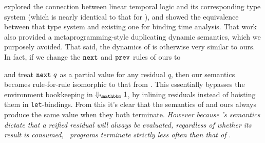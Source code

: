 \cite{davies96} explored the connection between linear temporal logic and its corresponding type system (which is nearly identical to that for \lang), 
and showed the equivalence between that type system and existing one for binding time analysis. 
That work also provided a metaprogramming-style duplicating dynamic semantics, which we purposely avoided.
That said, the dynamics of \cite{davies96} is otherwise very similar to ours.
In fact, if we change the ${\tt next}$ and ${\tt prev}$ rules of ours to 
and treat ${\tt next}~q$ as a partial value for any residual $q$,
then our semantics becomes rule-for-rule isomorphic to that from \cite{davies96}. This essentially bypasses the
environment bookkeeping in $\redonesym$, by inlining residuals instead of
hoisting them in \verb|let|-bindings.
From this it's clear that the semantics of \cite{davies96} and ours always produce the same value when they both terminate.
{\em However because \lang's semantics dictate that a reified residual will always be evaluated, regardless of whether its result is consumed, \lang\ programs terminate strictly less often than that of \cite{davies96}}.

